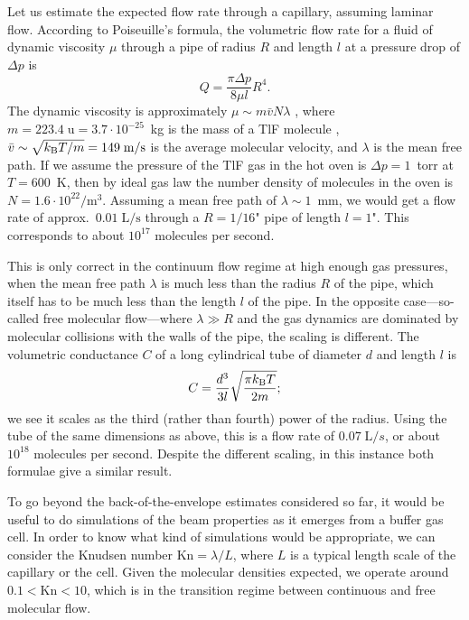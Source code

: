 Let us estimate the expected flow rate through a capillary, assuming laminar
flow. According to Poiseuille's formula, the volumetric flow rate for a fluid of
dynamic viscosity $\mu$ through a pipe of radius $R$ and length $l$ at a
pressure drop of $\Delta p$ is \cite[eqn~17.10]{landau2013fluid}
%
\[
   Q=\frac{\pi\Delta p}{8\mu l}R^4.
\]
%
The dynamic viscosity is approximately $\mu\sim m\bar{v}N\lambda$
\cite[eqn~8.11]{pitaevskii2012physical}, where
$m=223.4\;\text{u}=3.7\cdot10^{-25}$~kg is the mass of a TlF molecule
\cite{linstrom2001nist}, $\bar{v}\sim\sqrt{k_\text{B} T/m}=149\;\text{m/s}$ is the
average molecular velocity, and $\lambda$ is the mean free path.  If we assume
the pressure of the TlF gas in the hot oven is $\Delta p=1$~torr at $T=600$~K,
then by ideal gas law the number density of molecules in the oven is
$N=1.6\cdot10^{22}/\text{m}^3$.  Assuming a mean free path of $\lambda\sim1$~mm,
we would get a flow rate of approx.\ $0.01\;\text{L}/\text{s}$ through a
$R=1/16$" pipe of length $l=1$". This corresponds to about $10^{17}$ molecules
per second.

This is only correct in the continuum flow regime at high enough gas pressures,
when the mean free path $\lambda$ is much less than the radius $R$ of the pipe,
which itself has to be much less than the length $l$ of the pipe. In the
opposite case---so-called free molecular flow---where $\lambda\gg R$ and the gas
dynamics are dominated by molecular collisions with the walls of the pipe, the
scaling is different. The volumetric conductance $C$ of a long cylindrical
tube of diameter $d$ and length $l$ is \cite[eqn~2.21]{livesey1998flow}
%
\[
    C=\frac{d^3}{3l}\sqrt{\frac{\pi k_\text{B} T}{2m}};
\]
%
we see it scales as the third (rather than fourth) power of the radius. Using
the tube of the same dimensions as above, this is a flow rate of
$0.07\;\text{L}/s$, or about $10^{18}$ molecules per second. Despite the
different scaling, in this instance both formulae give a similar result.

To go beyond the back-of-the-envelope estimates considered so far, it would be
useful to do simulations of the beam properties as it emerges from a buffer gas
cell. In order to know what kind of simulations would be appropriate, we can
consider the Knudsen number $\text{Kn}=\lambda/L$, where $L$ is a typical length
scale of the capillary or the cell. Given the molecular densities expected, we
operate around $0.1<\text{Kn}<10$, which is in the transition regime between
continuous and free molecular flow. \cite{shen2018multiparameter}

